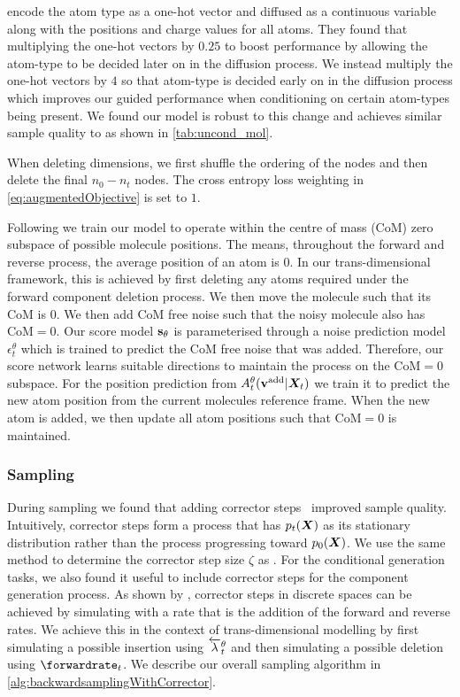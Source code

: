\citet{hoogeboom2022equivariant} encode the atom type as a one-hot vector and diffused as a continuous variable along with the positions and charge values for all atoms. They found that multiplying the one-hot vectors by $0.25$ to boost performance by allowing the atom-type to be decided later on in the diffusion process. We instead multiply the one-hot vectors by $4$ so that atom-type is decided early on in the diffusion process which improves our guided performance when conditioning on certain atom-types being present. We found our model is robust to this change and achieves similar sample quality to \citet{hoogeboom2022equivariant} as shown in \cref{tab:uncond_mol}.

When deleting dimensions, we first shuffle the ordering of the nodes and then delete the final $n_0 - n_t$ nodes. The cross entropy loss weighting in \cref{eq:augmentedObjective} is set to $1$.

Following \citet{hoogeboom2022equivariant} we train our model to operate within the centre of mass (CoM) zero subspace of possible molecule positions. The means, throughout the forward and reverse process, the average position of an atom is $0$. In our trans-dimensional framework, this is achieved by first deleting any atoms required under the forward component deletion process. We then move the molecule such that its CoM is $0$. We then add CoM free noise such that the noisy molecule also has CoM$=0$. Our score model ${\mathbf{s}}_\theta$ is parameterised through a noise prediction model $\epsilon_t^\theta$ which is trained to predict the CoM free noise that was added. Therefore, our score network learns suitable directions to maintain the process on the CoM$=0$ subspace. For the position prediction from $A_t^\theta({\mathbf{v}}^{\textup{add}} | {\bm{X}}_t)$ we train it to predict the new atom position from the current molecules reference frame. When the new atom is added, we then update all atom positions such that CoM$=0$ is maintained.

\subsubsection{Sampling}
During sampling we found that adding corrector steps~\citep{song2020score} improved sample quality. Intuitively, corrector steps form a process that has $p_t({\bm{X}})$ as its stationary distribution rather than the process progressing toward $p_0({\bm{X}})$. We use the same method to determine the corrector step size $\zeta$ as \citet{song2020score}. For the conditional generation tasks, we also found it useful to include corrector steps for the component generation process. As shown by \citet{campbell2022continuous}, corrector steps in discrete spaces can be achieved by simulating with a rate that is the addition of the forward and reverse rates. We achieve this in the context of trans-dimensional modelling by first simulating a possible insertion using $\overleftarrow{\lambda}_t^\theta$ and then simulating a possible deletion using $\forwardrate_t$. We describe our overall sampling algorithm in \cref{alg:backwardsamplingWithCorrector}.


